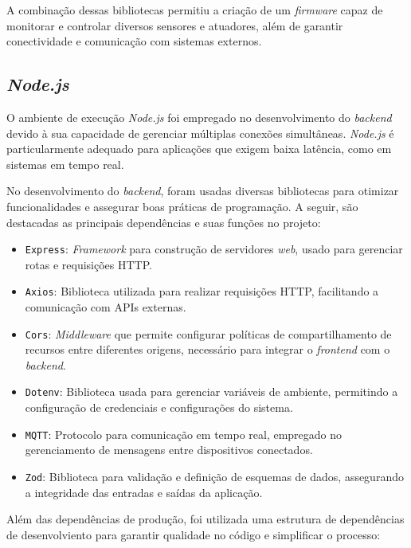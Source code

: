A combinação dessas bibliotecas permitiu a criação de um \textit{firmware} capaz de monitorar e controlar diversos sensores e atuadores, além de garantir conectividade e comunicação com sistemas externos.

\subsection{\textit{Node.js}}
O ambiente de execução \textit{Node.js} foi empregado no desenvolvimento do \textit{backend} devido à sua capacidade de gerenciar múltiplas conexões simultâneas. \textit{Node.js} é particularmente adequado para aplicações que exigem baixa latência, como em sistemas em tempo real.

No desenvolvimento do \textit{backend}, foram usadas diversas bibliotecas para otimizar funcionalidades e assegurar boas práticas de programação. A seguir, são destacadas as principais dependências e suas funções no projeto:

\begin{itemize}
    \item \texttt{Express}: \textit{Framework} para construção de servidores \textit{web}, usado para gerenciar rotas e requisições HTTP.
    \item \texttt{Axios}: Biblioteca utilizada para realizar requisições HTTP, facilitando a comunicação com APIs externas.
    \item \texttt{Cors}: \textit{Middleware} que permite configurar políticas de compartilhamento de recursos entre diferentes origens, necessário para integrar o \textit{frontend} com o \textit{backend}.
    \item \texttt{Dotenv}: Biblioteca usada para gerenciar variáveis de ambiente, permitindo a configuração de credenciais e configurações do sistema.
    \item \texttt{MQTT}: Protocolo para comunicação em tempo real, empregado no gerenciamento de mensagens entre dispositivos conectados.
    \item \texttt{Zod}: Biblioteca para validação e definição de esquemas de dados, assegurando a integridade das entradas e saídas da aplicação.
\end{itemize}

Além das dependências de produção, foi utilizada uma estrutura de dependências de desenvolviento para garantir qualidade no código e simplificar o processo:

